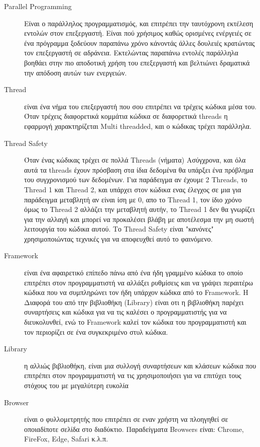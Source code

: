\begin{Definitions}

\begin{description}
    \item [Parallel Programming] Είναι ο παράλληλος προγραμματισμός, και επιτρέπει την ταυτόχρονη εκτέλεση εντολών στον επεξεργαστή. Είναι πού χρήσιμος καθώς ορισμένες ενέργειές σε ένα πρόγραμμα ξοδεύουν παραπάνω χρόνο κάνοντάς άλλες δουλειές κρατώντας τον επεξεργαστή σε αδράνεια. Εκτελώντας παραπάνω εντολές παράλληλα βοηθάει στην πιο αποδοτική χρήση του επεξεργαστή και βελτιώνει δραματικά την απόδοση αυτών των ενεργειών. 
    \item [Thread] είναι ένα νήμα του επεξεργαστή που σου επιτρέπει να τρέχεις κώδικα μέσα του. Όταν τρέχεις διαφορετικά κομμάτια κώδικα σε διαφορετικά threads η εφαρμογή χαρακτηρίζεται Multi threadded, και ο κώδικας τρέχει παράλληλα.
    \item [Thread Safety] Όταν ένας κώδικας τρέχει σε πολλά Threads (νήματα) Ασύγχρονα, και όλα αυτά τα threads έχουν πρόσβαση στα ίδια δεδομένα θα υπάρξει ένα πρόβλημα του συγχρονισμού των δεδομένων. Για παράδειγμα αν έχουμε 2 Threads, το Thread 1 και Thread 2, και υπάρχει στον κώδικα ενας έλεγχος σε μια για παράδειγμα μεταβλητή αν είναι ίση με 0, απο το Thread 1, τον ίδιο χρόνο όμως το Thread 2 αλλάζει την μεταβλητή αυτήν, το Thread 1 δεν θα γνωρίζει για την αλλαγή και μπορεί να προκαλέσει βλάβη με αποτέλεσμα την μη σωστή λειτουργία του κώδικα αυτού. Το Thread Safety είναι "κανόνες" χρησιμοποιώντας τεχνικές για να αποφευχθεί αυτό το φαινόμενο.
    \item [Framework] είναι ένα αφαιρετικό επίπεδο πάνω από ένα ήδη γραμμένο κώδικα το οποίο επιτρέπει στον προγραμματιστή να αλλάξει ρυθμίσεις και να γράψει περαιτέρω κώδικα που να συμπληρώνει τον ήδη υπάρχον κώδικα από το Framework. Η Διαφορά του από την βιβλιοθήκη (Library) είναι οτι η βιβλιοθήκη παρέχει συναρτήσεις και κώδικα για να τις καλέσει ο προγραμματιστής για να διευκολυνθεί, ενώ το Framework καλεί τον κώδικα του προγραμματιστή και τον περιορίζει σε ένα συγκεκριμένο στυλ κώδικα.
    \item [Library] η αλλιώς βιβλιοθήκη, είναι μια συλλογή συναρτήσεων και κλάσεων κώδικα που επιτρέπει στον προγραμματιστή να τις χρησιμοποιήσει για να επιτύχει τους στόχους του με μεγαλύτερη ευκολία
    \item [Browser] είναι ο φυλλομετρητής που επιτρέπει σε εναν χρήστη να πλοηγηθεί σε οποιαδίποτε σελίδα στο διαδύκτιο. Παραδείγματα Browsers είναι: Chrome, FireFox, Edge, Safari κ.λ.π.

\end{description}
\end{Definitions}
